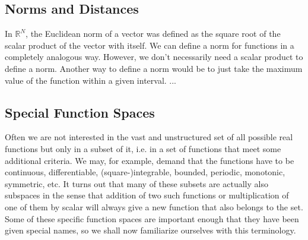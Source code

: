 \subsection{Norms and Distances}
In $\mathbb{R}^N$, the Euclidean norm of a vector was defined as the square root of the scalar product of the vector with itself. We can define a norm for functions in a completely analogous way. However, we don't necessarily need a scalar product to define a norm. Another way to define a norm would be to just take the maximum value of the function within a given interval. ...





\subsection{Special Function Spaces}
Often we are not interested in the vast and unstructured set of all possible real functions but only in a subset of it, i.e. in a set of functions that meet some additional criteria. We may, for example, demand that the functions have to be continuous, differentiable, (square-)integrable, bounded, periodic, monotonic, symmetric, etc. It turns out that many of these subsets are actually also subspaces in the sense that addition of two such functions or multiplication of one of them by scalar will always give a new function that also belongs to the set. Some of these specific function spaces are important enough that they have been given special names, so we shall now familiarize ourselves with this terminology.

